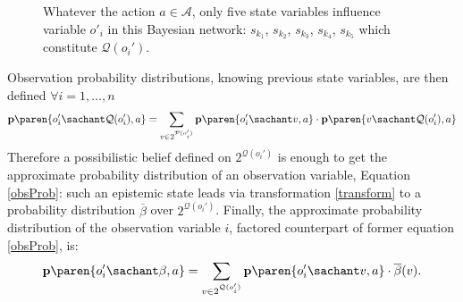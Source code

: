 \begin{figure}
\caption[Grand-parents of an observation variable]{Whatever the action $a \in \mathcal{A}$, only five state variables 
influence variable $o'_i$ in this Bayesian network: 
$s_{k_1}$, $s_{k_2}$, $s_{k_3}$, $s_{k_4}$, $s_{k_5}$ 
which constitute $\mathcal{Q}(o_i')$.}
\label{obsVarDep}
\end{figure}

Observation probability distributions, knowing previous state variables, 
are then defined $\forall i=1,\ldots,n$
\begin{equation}
\label{obsDistrib} \textbf{p} \paren{ o_i' \sachant \mathcal{Q}(o_i'), a } = \sum_{ v \in 2^{\mathcal{P}(o'_i)}} \textbf{p} \paren{ o'_i \sachant v ,a } \cdot \textbf{p} \paren{ v \sachant \mathcal{Q}(o_i') ,a}
\end{equation}
Therefore a possibilistic belief defined on $2^{ \mathcal{Q}(o_i')}$ is enough to
get the approximate probability distribution of an observation variable, Equation \ref{obsProb}: 
such an epistemic state
leads via transformation \ref{transform} to a probability distribution $\overline{\beta}$
over $2^{\mathcal{Q}(o_i')}$. 
Finally, the approximate probability distribution of the observation variable $i$,
factored counterpart of former equation \ref{obsProb}, is:
\begin{equation}
\label{probObel}
\textbf{p} \paren{ o_i' \sachant \beta,a } = \sum_{ v \in 2^{\mathcal{Q}(o_i')}} \textbf{p} \paren{ o_i' \sachant v,a } \cdot \overline{\beta}(v).
\end{equation}

